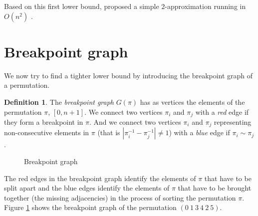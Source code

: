 \documentclass[11pt,DIV=11]{scrartcl}
\theoremstyle{definition}
\newtheorem{definition}[theorem]{Definition}
\theoremstyle{remark}
\begin{document}
Based on this first lower bound, \citeauthor*{Kececioglu1995} proposed a simple $2$-approximation running in $O(n^2)$ \cite{Kececioglu1995}.

\section{Breakpoint graph}
\label{sec:breakpoint_graph}

We now try to find a tighter lower bound by introducing the breakpoint graph of a permutation.

\begin{definition}
The \textit{breakpoint graph} $G(\pi)$ has as vertices the elements of the permutation $\pi$, $[0, n+1]$. We connect two vertices $\pi_i$ and $\pi_j$ with a \textit{red} edge if they form a breakpoint in $\pi$. And we connect two vertices $\pi_i$ and $\pi_j$ representing non-consecutive elements in $\pi$ (that is $|\pi_i^{-1} - \pi_j^{-1}| \neq 1$) with a \textit{blue} edge if $\pi_i \sim \pi_j$.
\end{definition}

\begin{figure}
    \centering
    \caption{Breakpoint graph}
    \label{fig:breakpoint_graph}
\end{figure}

The red edges in the breakpoint graph identify the elements of $\pi$ that have to be split apart and the blue edges identify the elements of $\pi$ that have to be brought together (the missing adjacencies) in the process of sorting the permutation $\pi$. Figure \ref{fig:breakpoint_graph} shows the breakpoint graph of the permutation $(0\ 1\ 3\ 4\ 2\ 5)$.
\end{document}
